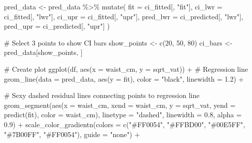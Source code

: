 \documentclass[
  letterpaper,
  DIV=11,
  numbers=noendperiod]{scrreprt}
\newenvironment{Shaded}{\begin{snugshade}}{\end{snugshade}}
\newcommand{\AttributeTok}[1]{\textcolor[rgb]{0.40,0.45,0.13}{#1}}
\newcommand{\CommentTok}[1]{\textcolor[rgb]{0.37,0.37,0.37}{#1}}
\newcommand{\DecValTok}[1]{\textcolor[rgb]{0.68,0.00,0.00}{#1}}
\newcommand{\FloatTok}[1]{\textcolor[rgb]{0.68,0.00,0.00}{#1}}
\newcommand{\FunctionTok}[1]{\textcolor[rgb]{0.28,0.35,0.67}{#1}}
\newcommand{\NormalTok}[1]{\textcolor[rgb]{0.00,0.23,0.31}{#1}}
\newcommand{\OtherTok}[1]{\textcolor[rgb]{0.00,0.23,0.31}{#1}}
\newcommand{\SpecialCharTok}[1]{\textcolor[rgb]{0.37,0.37,0.37}{#1}}
\newcommand{\StringTok}[1]{\textcolor[rgb]{0.13,0.47,0.30}{#1}}
\begin{document}
\begin{Shaded}
\begin{Highlighting}[]
\NormalTok{pred\_data }\OtherTok{\textless{}{-}}\NormalTok{ pred\_data }\SpecialCharTok{\%\textgreater{}\%}
  \FunctionTok{mutate}\NormalTok{(}
    \AttributeTok{fit =}\NormalTok{ ci\_fitted[, }\StringTok{"fit"}\NormalTok{],}
    \AttributeTok{ci\_lwr =}\NormalTok{ ci\_fitted[, }\StringTok{"lwr"}\NormalTok{],}
    \AttributeTok{ci\_upr =}\NormalTok{ ci\_fitted[, }\StringTok{"upr"}\NormalTok{],}
    \AttributeTok{pred\_lwr =}\NormalTok{ ci\_predicted[, }\StringTok{"lwr"}\NormalTok{],}
    \AttributeTok{pred\_upr =}\NormalTok{ ci\_predicted[, }\StringTok{"upr"}\NormalTok{]}
\NormalTok{  )}

\CommentTok{\# Select 3 points to show CI bars}
\NormalTok{show\_points }\OtherTok{\textless{}{-}} \FunctionTok{c}\NormalTok{(}\DecValTok{20}\NormalTok{, }\DecValTok{50}\NormalTok{, }\DecValTok{80}\NormalTok{)}
\NormalTok{ci\_bars }\OtherTok{\textless{}{-}}\NormalTok{ pred\_data[show\_points, ]}

\CommentTok{\# Create plot}
\FunctionTok{ggplot}\NormalTok{(df, }\FunctionTok{aes}\NormalTok{(}\AttributeTok{x =}\NormalTok{ waist\_cm, }\AttributeTok{y =}\NormalTok{ sqrt\_vat)) }\SpecialCharTok{+}
  \CommentTok{\# Regression line}
  \FunctionTok{geom\_line}\NormalTok{(}\AttributeTok{data =}\NormalTok{ pred\_data, }\FunctionTok{aes}\NormalTok{(}\AttributeTok{y =}\NormalTok{ fit), }\AttributeTok{color =} \StringTok{"black"}\NormalTok{, }\AttributeTok{linewidth =} \FloatTok{1.2}\NormalTok{) }\SpecialCharTok{+}
  
  \CommentTok{\# Sexy dashed residual lines connecting points to regression line}
  \FunctionTok{geom\_segment}\NormalTok{(}\FunctionTok{aes}\NormalTok{(}\AttributeTok{x =}\NormalTok{ waist\_cm, }\AttributeTok{xend =}\NormalTok{ waist\_cm, }
                   \AttributeTok{y =}\NormalTok{ sqrt\_vat, }\AttributeTok{yend =} \FunctionTok{predict}\NormalTok{(fit),}
                   \AttributeTok{color =}\NormalTok{ waist\_cm),}
               \AttributeTok{linetype =} \StringTok{"dashed"}\NormalTok{, }\AttributeTok{linewidth =} \FloatTok{0.8}\NormalTok{, }\AttributeTok{alpha =} \FloatTok{0.9}\NormalTok{) }\SpecialCharTok{+}
  \FunctionTok{scale\_color\_gradientn}\NormalTok{(}\AttributeTok{colors =} \FunctionTok{c}\NormalTok{(}\StringTok{"\#FF0054"}\NormalTok{, }\StringTok{"\#FFBD00"}\NormalTok{, }\StringTok{"\#00E5FF"}\NormalTok{, }\StringTok{"\#7B00FF"}\NormalTok{, }\StringTok{"\#FF0054"}\NormalTok{),}
                        \AttributeTok{guide =} \StringTok{"none"}\NormalTok{) }\SpecialCharTok{+}
  

\end{Highlighting}
\end{Shaded}
\end{document}
